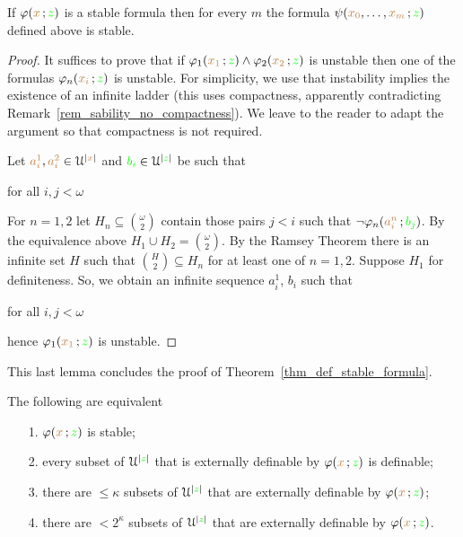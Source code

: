 \documentclass[creche.tex]{subfiles}
\begin{document}
\begin{lemma}\label{lem_stable3}
If $\varphi({\color{brown} x}\,;{\color{green} z})$ is a stable formula then for every $m$ the formula $\psi({\color{brown} x_0},\dots,{\color{brown} x_m}\,;{\color{green} z})$ defined above is stable.
\end{lemma}

\begin{proof}
It suffices to prove that if $\varphi_1({\color{brown} x_1}\,;{\color{green} z})\wedge\varphi_2({\color{brown} x_2}\,;{\color{green} z})$ is unstable then one of the formulas $\varphi_n({\color{brown} x_i}\,;{\color{green} z})$ is unstable. For simplicity, we use that instability implies the existence of an infinite ladder (this uses compactness, apparently contradicting Remark~\ref{rem_sability_no_compactness}). We leave to the reader to adapt the argument so that compactness is not required.

Let ${\color{brown} a^1_i},{\color{brown} a^2_i}\in\EuScript U^{|{\color{brown} x}|}$ and ${\color{green} b_i}\in\EuScript U^{|{\color{green} z}|}$ be such that 

\hfill for all $i,j<\omega$

For $n=1,2$ let $H_n\subseteq{\omega\choose 2}$ contain those pairs $j<i$ such that $\neg\varphi_n({\color{brown} a^n_i}\,;{\color{green} b_j})$. 
By the equivalence above $H_1\cup H_2={\omega\choose 2}$. 
By the Ramsey Theorem there is an infinite set $H$ such that ${H\choose 2}\subseteq H_n$ for at least one of $n=1,2$. Suppose $H_1$ for definiteness. So, we obtain an infinite sequence $a^1_i$, $b_i$ such that

\hfill for all $i,j<\omega$

hence $\varphi_1({\color{brown} x_1}\,;{\color{green} z})$ is unstable.
\end{proof}

This last lemma concludes the proof of Theorem~\ref{thm_def_stable_formula}. 


\begin{theorem}\label{thm_def_stable_formula2}
  The following are equivalent
  \begin{itemize}
    \item[1.] $\varphi({\color{brown} x}\,;{\color{green} z})$ is stable;
    \item[2.] every subset of $\EuScript U^{|{\color{green} z}|}$ that is externally definable by $\varphi({\color{brown} x}\,;{\color{green} z})$ is definable;
    \item[3.] there are $\le\kappa$ subsets of $\EuScript U^{|{\color{green} z}|}$ that are externally definable by $\varphi({\color{brown} x}\,;{\color{green} z})$;
    \item[4.] there are $<2^\kappa$ subsets of $\EuScript U^{|{\color{green} z}|}$ that are externally definable by $\varphi({\color{brown} x}\,;{\color{green} z})$.
  \end{itemize}
\end{theorem}
\end{document}

